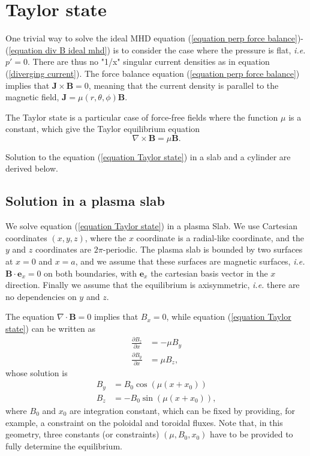 \documentclass[my_thesis.tex]{subfiles}
\begin{document}
\section{Taylor state}
\label{section taylor state}
One trivial way to solve the ideal MHD equation (\ref{equation perp force balance})-(\ref{equation div B ideal mhd}) is to consider the case where the pressure is flat, \textit{i.e.} $p'=0$. There are thus no "1/x" singular current densities as in equation (\ref{diverging current}). The force balance equation (\ref{equation perp force balance}) implies that $\mathbf{J}\times\mathbf{B}=0$, meaning that the current density is parallel to the magnetic field, $\mathbf{J}=\mu(r,\theta,\phi)\mathbf{B}$.

The Taylor state \citep{Taylor1974,Taylor1986} is a particular case of force-free fields where the function $\mu$ is a constant, which give the Taylor equilibrium equation
\begin{equation}
	\nabla\times\mathbf{B}=\mu\mathbf{B}. \label{equation Taylor state}
\end{equation}

Solution to the equation (\ref{equation Taylor state}) in a slab and a cylinder are derived below.

\subsection{Solution in a plasma slab}
We solve equation (\ref{equation Taylor state}) in a plasma Slab. We use Cartesian coordinates $(x,y,z)$, where the $x$ coordinate is a radial-like coordinate, and the $y$ and $z$ coordinates are $2\pi$-periodic. The plasma slab is bounded by two surfaces at $x=0$ and $x=a$, and we assume that these surfaces are magnetic surfaces, \textit{i.e.} $\mathbf{B}\cdot\mathbf{e}_x=0$ on both boundaries, with $\mathbf{e}_x$ the cartesian basis vector in the $x$ direction. Finally we assume that the equilibrium is axisymmetric, \textit{i.e.} there are no dependencies on $y$ and $z$.

The equation $\nabla\cdot\mathbf{B}=0$ implies that $B_x=0$, while equation (\ref{equation Taylor state}) can be written as
\begin{align}
	\frac{\partial B_z}{\partial x} &= -\mu B_y\\
	\frac{\partial B_y}{\partial x} &= \mu B_z,
\end{align}
whose solution is
\begin{align}
	B_y &= B_0 \cos(\mu (x + x_0))\\
	B_z &= -B_0 \sin(\mu (x + x_0)),
\end{align}
where $B_0$ and $x_0$ are integration constant, which can be fixed by providing, for example, a constraint on the poloidal and toroidal fluxes. Note that, in this geometry, three constants (or constraints) $(\mu,B_0,x_0)$ have to be provided to fully determine the equilibrium.
\end{document}
